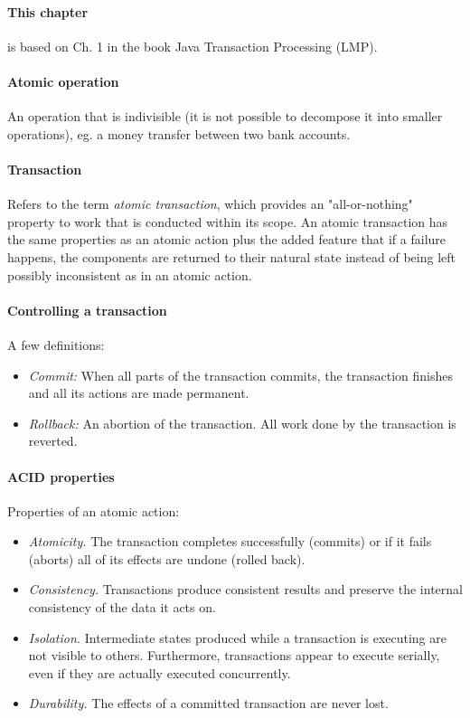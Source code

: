 
\paragraph{This chapter} is based on Ch. 1 in the book Java Transaction Processing (LMP).

\sepline

\paragraph{Atomic operation} An operation that is indivisible (it is not possible to decompose it into smaller operations), eg. a money transfer between two bank accounts.

\paragraph{Transaction} Refers to the term \textit{atomic transaction}, which provides an "all-or-nothing" property to work that is conducted within its scope. An atomic transaction has the same properties as an atomic action plus the added feature that if a failure happens, the components are returned to their natural state instead of being left possibly inconsistent as in an atomic action.

\paragraph{Controlling a transaction} A few definitions:
\begin{itemize}
  \item \textit{Commit:} When all parts of the transaction commits, the transaction finishes and all its actions are made permanent.
  \item \textit{Rollback:} An abortion of the transaction. All work done by the transaction is reverted.
\end{itemize}

\paragraph{ACID properties} Properties of an atomic action:
\begin{itemize}[nolistsep,noitemsep]
  \item \textit{Atomicity.} The transaction completes successfully (commits) or if it fails (aborts) all of its effects are undone (rolled back).
  \item \textit{Consistency.} Transactions produce consistent results and preserve the internal consistency of the data it acts on.
  \item \textit{Isolation.} Intermediate states produced while a transaction is executing are not visible to others. Furthermore, transactions appear to execute serially, even if they are actually executed concurrently.
  \item \textit{Durability.} The effects of a committed transaction are never lost.
\end{itemize}

